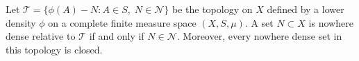 Let $\mathcal{T} = \{\phi(A) - N : A \in S,\; N \in \mathcal{N}\}$ be the topology on $X$ defined by a lower density $\phi$ on a complete finite measure space $(X, S, \mu)$. A set $N \subset X$ is nowhere dense relative to $\mathcal{T}$ if and only if $N \in \mathcal{N}$. Moreover, every nowhere dense set in this topology is closed.
